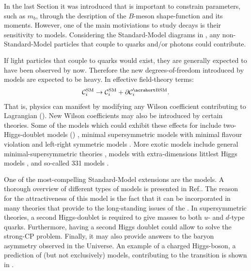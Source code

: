 In the last Section it was introduced that \BtoXsgamma is important to constrain \SM parameters, such as $m_b$, through the desription of the $B$-meson shape-function and its moments.
However, one of the main motiviations to study \BtoXsgamma decays is their sensitivity to \BSM models.
Considering the Standard-Model diagrams in , any non-Standard-Model particles that couple to quarks and/or photons could contribute.

If light particles that couple to quarks would exist, they are generally expected to have been observed by now.
Therefore the new degrees-of-freedom introduced by \BSM models are expected to be heavy.
In effective field-theory terms:
\begin{equation}\label{eq:corr_wilson}
    \mathcal{C}_i^{\mathrm{SM}} \ra \mathcal{C}_i^{\mathrm{SM}} + \partial\mathcal{C}_i^{\mathrm{\BSM}}.
\end{equation}
That is, \BSM physics can manifest by modifying any Wilson coefficient contributing to \btosgamma Lagrangian ().
New Wilson coefficients may also be introduced by certain theories.
Some of the models which could exhibit these effects for \BtoXsgamma include 
two-Higgs-doublet models (\TwoHDM) \cite{Borzumati:1998tg,Bobeth:1999ww,Hermann:2012fc}, 
minimal supersymmetric models with minimal flavour violation \cite{Bobeth:1999ww,Borzumati:2003rr,Degrassi:2006eh,Freitas:2007dp}
and left-right symmetric models \cite{Bobeth:1999ww}.
More exotic models include 
general minimal-supersymmetric theories \cite{Ciuchini:2007ha},
models with extra-dimensions \cite{Buras:2003mk,Agashe:2004cp,Haisch:2007vb,Freitas:2008vh}
littlest Higgs models \cite{Buras:2006wk,Blanke:2006sb},
and so-called 331 models \cite{Promberger:2008xg}.

One of the most-compelling Standard-Model extensions are the \TwoHDM models.
A thorough overview of different types of \TwoHDM models is presented in Ref.\cite{Branco:2011iw}.
The reason for the attractiveness of this model is the fact that it can be incorporated in many theories that provide to the long-standing issues of the \SM.
In supersymmetric theories, a second Higgs-doublet is required to give masses to both $u$- and $d$-type quarks.
Furthermore, having a second Higgs doublet could allow to solve the strong-CP problem.
Finally, it may also provide answers to the baryon asymmetry observed in the Universe.
An example of a charged Higgs-boson, a prediction of (but not exclusively) \TwoHDM models, contributing to the \btosgamma transition is shown in .

